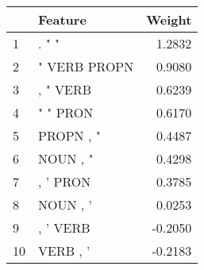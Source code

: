 \begin{tabular}{llr}
\toprule
{} &       Feature &  Weight \\
\midrule
1  &         . " " &  1.2832 \\
2  &  " VERB PROPN &  0.9080 \\
3  &      , " VERB &  0.6239 \\
4  &      " " PRON &  0.6170 \\
5  &     PROPN , " &  0.4487 \\
6  &      NOUN , " &  0.4298 \\
7  &      , ' PRON &  0.3785 \\
8  &      NOUN , ' &  0.0253 \\
9  &      , ' VERB & -0.2050 \\
10 &      VERB , ' & -0.2183 \\
\bottomrule
\end{tabular}
